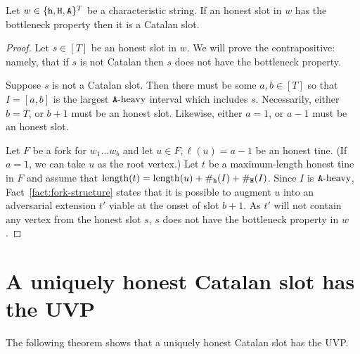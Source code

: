 \begin{fact}\label{fact:almost-cp-implies-catalan}
  Let $w \in \{\mathtt{h}, \mathtt{H}, \mathtt{A}\}^T$ be a characteristic string. 
  If an honest slot in $w$ has the bottleneck property then 
  it is a Catalan slot.
\end{fact}
\begin{proof}
  Let $s \in [T]$ be an honest slot in $w$.  
  We will prove the contrapositive: namely, 
  that if $s$ is not Catalan then $s$ does not have the bottleneck property. 
  
  Suppose $s$ is not a Catalan slot.
  Then there must be some $a, b \in [T]$ so that 
  $I = [a, b]$ is the largest $\mathtt{A}\text{-heavy}$ interval 
  which includes $s$. 
  Necessarily, either $b = T$, or $b + 1$ must be an honest slot. 
  Likewise, either $a = 1$, or $a - 1$ must be an honest slot. 
  
  Let $F$ be a fork for $w_1 \ldots w_b$ 
  and let $u \in F, \ell(u) = a - 1$ be an honest tine. 
  (If $a = 1$, we can take $u$ as the root vertex.)  
  Let $t$ be a maximum-length honest tine in $F$ 
  and assume that $\operatorname{length}(t) = \operatorname{length}(u) + \#_{\mathtt{h}}(I) + \#_{\mathtt{H}}(I)$.
  Since $I$ is $\mathtt{A}\text{-heavy}$, 
  Fact~\ref{fact:fork-structure} 
  states that 
  it is possible to augment $u$ into 
  an adversarial extension $t'$ 
  viable at the onset of slot $b + 1$. 
  As $t'$ will not contain any vertex from the honest slot $s$,  
  $s$ does not have the bottleneck property in $w$.
\end{proof}


\section{A uniquely honest Catalan slot has the UVP}

The following theorem shows that a uniquely honest Catalan slot has the UVP.





